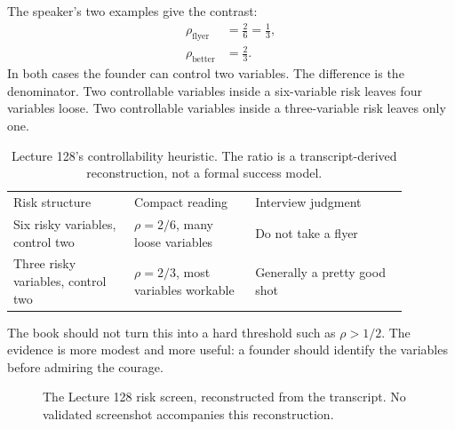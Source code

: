 \documentclass[11pt,oneside]{book}
\begin{document}
The speaker's two examples give the contrast:
\begin{align}
\rho_{\mathrm{flyer}}&=\frac{2}{6}=\frac{1}{3},\\
\rho_{\mathrm{better}}&=\frac{2}{3}.
\end{align}
In both cases the founder can control two variables. The difference is the denominator. Two controllable variables inside a six-variable risk leaves four variables loose. Two controllable variables inside a three-variable risk leaves only one.

\begin{table}
\centering
\begin{tabular}{p{0.27\linewidth} p{0.27\linewidth} p{0.34\linewidth}}
Risk structure & Compact reading & Interview judgment \\
Six risky variables, control two & \(\rho=2/6\), many loose variables & Do not take a flyer \\
Three risky variables, control two & \(\rho=2/3\), most variables workable & Generally a pretty good shot \\
\end{tabular}
\caption{Lecture 128's controllability heuristic. The ratio is a transcript-derived reconstruction, not a formal success model.}
\end{table}

The book should not turn this into a hard threshold such as \(\rho>1/2\). The evidence is more modest and more useful: a founder should identify the variables before admiring the courage.

\begin{figure}
\centering
{}
\caption{The Lecture 128 risk screen, reconstructed from the transcript. No validated screenshot accompanies this reconstruction.}
\end{figure}
\end{document}
